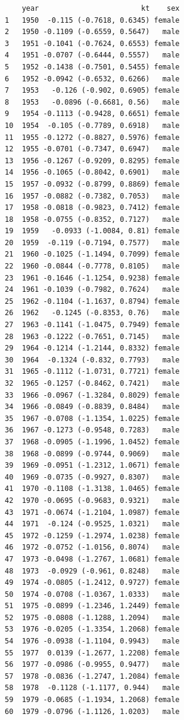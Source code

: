 \documentclass[
  12pt,
]{report}
\begin{document}
\begin{verbatim}
    year                        kt    sex
1   1950  -0.115 (-0.7618, 0.6345) female
2   1950 -0.1109 (-0.6559, 0.5647)   male
3   1951 -0.1041 (-0.7624, 0.6553) female
4   1951 -0.0707 (-0.6444, 0.5557)   male
5   1952 -0.1438 (-0.7501, 0.5455) female
6   1952 -0.0942 (-0.6532, 0.6266)   male
7   1953   -0.126 (-0.902, 0.6905) female
8   1953   -0.0896 (-0.6681, 0.56)   male
9   1954 -0.1113 (-0.9428, 0.6651) female
10  1954  -0.105 (-0.7789, 0.6918)   male
11  1955 -0.1272 (-0.8827, 0.5976) female
12  1955 -0.0701 (-0.7347, 0.6947)   male
13  1956 -0.1267 (-0.9209, 0.8295) female
14  1956 -0.1065 (-0.8042, 0.6901)   male
15  1957 -0.0932 (-0.8799, 0.8869) female
16  1957 -0.0882 (-0.7382, 0.7053)   male
17  1958 -0.0818 (-0.9823, 0.7412) female
18  1958 -0.0755 (-0.8352, 0.7127)   male
19  1959   -0.0933 (-1.0084, 0.81) female
20  1959  -0.119 (-0.7194, 0.7577)   male
21  1960 -0.1025 (-1.1494, 0.7099) female
22  1960 -0.0844 (-0.7778, 0.8105)   male
23  1961 -0.1646 (-1.1254, 0.9238) female
24  1961 -0.1039 (-0.7982, 0.7624)   male
25  1962 -0.1104 (-1.1637, 0.8794) female
26  1962   -0.1245 (-0.8353, 0.76)   male
27  1963 -0.1141 (-1.0475, 0.7949) female
28  1963 -0.1222 (-0.7651, 0.7145)   male
29  1964 -0.1214 (-1.2144, 0.8332) female
30  1964  -0.1324 (-0.832, 0.7793)   male
31  1965 -0.1112 (-1.0731, 0.7721) female
32  1965 -0.1257 (-0.8462, 0.7421)   male
33  1966 -0.0967 (-1.3284, 0.8029) female
34  1966 -0.0849 (-0.8839, 0.8484)   male
35  1967 -0.0708 (-1.1354, 1.0225) female
36  1967 -0.1273 (-0.9548, 0.7283)   male
37  1968 -0.0905 (-1.1996, 1.0452) female
38  1968 -0.0899 (-0.9744, 0.9069)   male
39  1969 -0.0951 (-1.2312, 1.0671) female
40  1969 -0.0735 (-0.9927, 0.8307)   male
41  1970 -0.1108 (-1.3138, 1.0465) female
42  1970 -0.0695 (-0.9683, 0.9321)   male
43  1971 -0.0674 (-1.2104, 1.0987) female
44  1971  -0.124 (-0.9525, 1.0321)   male
45  1972 -0.1259 (-1.2974, 1.0238) female
46  1972 -0.0752 (-1.0156, 0.8074)   male
47  1973 -0.0498 (-1.2767, 1.0681) female
48  1973  -0.0929 (-0.961, 0.8248)   male
49  1974 -0.0805 (-1.2412, 0.9727) female
50  1974 -0.0708 (-1.0367, 1.0333)   male
51  1975 -0.0899 (-1.2346, 1.2449) female
52  1975 -0.0808 (-1.1288, 1.2094)   male
53  1976 -0.0205 (-1.3354, 1.2068) female
54  1976 -0.0938 (-1.1104, 0.9943)   male
55  1977  0.0139 (-1.2677, 1.2208) female
56  1977 -0.0986 (-0.9955, 0.9477)   male
57  1978 -0.0836 (-1.2747, 1.2084) female
58  1978  -0.1128 (-1.1177, 0.944)   male
59  1979 -0.0685 (-1.1934, 1.2068) female
60  1979 -0.0796 (-1.1126, 1.0203)   male

\end{verbatim}
\end{document}
